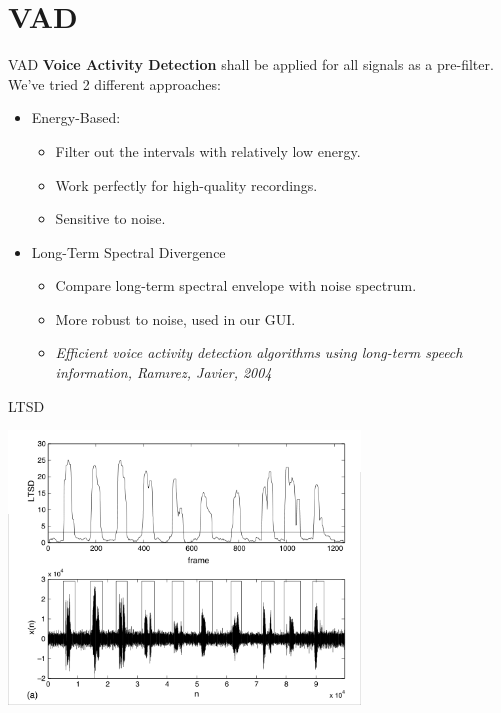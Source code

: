 

\section{VAD}
\begin{frame}{VAD}
  \textbf{Voice Activity Detection} shall be applied for all signals as a pre-filter.
  We've tried 2 different approaches:
  \pause
  \begin{itemize}
    \item Energy-Based:
      \begin{itemize}
        \item Filter out the intervals with relatively low energy.
        \item Work perfectly for high-quality recordings.
        \item Sensitive to noise.
      \end{itemize}
      \pause

    \item Long-Term Spectral Divergence
      \begin{itemize}
        \item Compare long-term spectral envelope with noise spectrum.
        \item More robust to noise, used in our GUI.
        \item
            \footnotesize\it\color{red!50!black}
            Efficient voice activity detection algorithms using long-term speech information,
            Ramırez, Javier, 2004
      \end{itemize}
  \end{itemize}
\end{frame}

\begin{frame}{LTSD}
  \begin{center}
    \includegraphics[width=0.7\textwidth]{res/ltsd.png}
  \end{center}
\end{frame}
